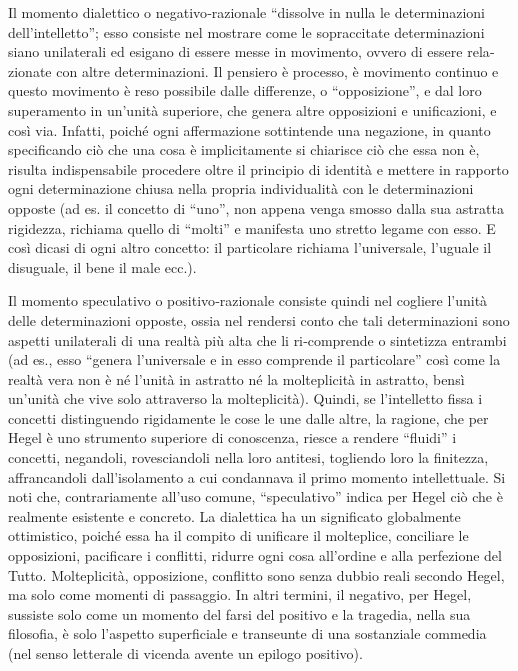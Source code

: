 \documentclass[a4paper,12pt,oneside,openany]{book}%
\begin{document}
Il momento dialettico o negativo‑razionale “dissolve in nulla le determinazioni dell’intelletto”; esso consiste nel mostrare come le sopraccitate determina­zioni siano unilaterali ed esigano di essere messe in movimento, ovvero di essere rela­zionate con altre determinazioni. Il pensiero è processo, è movimento continuo e questo movimento è reso possibile dalle differenze, o “opposizione”, e dal loro superamento in un’unità superiore, che genera altre opposizioni e unificazioni, e così via.  Infatti, poiché ogni affermazione sottintende una negazione, in quanto specificando ciò che una cosa è implicitamente si chiarisce ciò che essa non è, risulta indispensabile procedere oltre il principio di identità e mettere in rapporto ogni determinazione chiusa nella propria individualità con le determinazioni opposte (ad es. il concetto di “uno”, non appena venga smosso dalla sua astratta rigidezza, richiama quello di “molti” e manifesta uno stretto legame con esso. E così dicasi di ogni altro concetto: il particolare richiama l’universale, l’uguale il disuguale, il bene il male ecc.).

Il momento speculativo o positivo‑razionale consiste quindi nel cogliere l’unità delle determinazioni opposte, ossia nel rendersi conto che tali determinazio­ni sono aspetti unilaterali di una realtà più alta che li ri‑comprende o sintetizza entram­bi (ad es., esso “genera l’universale e in esso comprende il particolare” così come la realtà vera non è né l’unità in astratto né la molteplicità in astratto, bensì un’unità che vive solo attraverso la molteplicità). Quindi, se l’intelletto fissa i concetti distinguendo rigidamente le cose le une dalle altre, la ragione, che per Hegel è uno strumento superiore di conoscenza, riesce a rendere “fluidi” i concetti, negandoli, rovesciandoli nella loro antitesi, togliendo loro la finitezza, affrancandoli dall’isolamento a cui condannava il primo momento intellettuale. Si noti che, contrariamente all’uso comune, “speculativo” indica per Hegel ciò che è realmente esistente e concreto. La dialettica ha un significato globalmente ottimistico, poiché essa ha il compito di unificare il molteplice, conciliare le opposizioni, pacificare i conflitti, ridurre ogni cosa all’ordine e alla perfezione del Tutto. Molteplicità, opposizione, conflitto sono senza dubbio reali secondo Hegel, ma solo come momenti di passaggio. In altri termini, il negativo, per Hegel, sussiste solo come un momento del farsi del positivo e la tragedia, nella sua filosofia, è solo l’aspetto superficiale e transeunte di una sostanziale comme­dia (nel senso letterale di vicenda avente un epilogo positivo).
\end{document}
